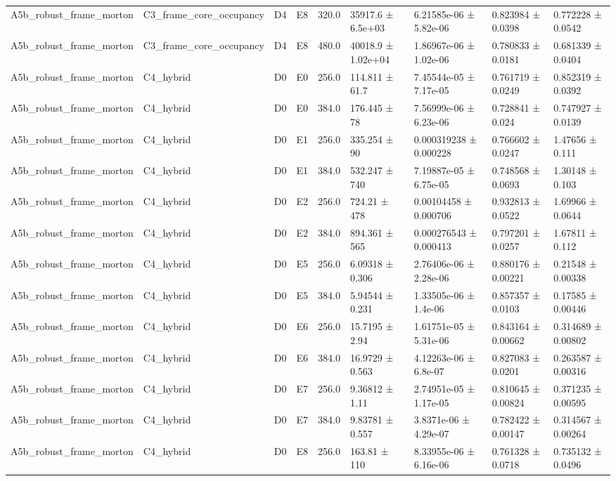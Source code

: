 \begin{table}
\begin{tabular}{lllllllll}
A5b\_robust\_frame\_morton & C3\_frame\_core\_occupancy & D4 & E8 & 320.0 & 35917.6 ± 6.5e+03 & 6.21585e-06 ± 5.82e-06 & 0.823984 ± 0.0398 & 0.772228 ± 0.0542 \\
A5b\_robust\_frame\_morton & C3\_frame\_core\_occupancy & D4 & E8 & 480.0 & 40018.9 ± 1.02e+04 & 1.86967e-06 ± 1.02e-06 & 0.780833 ± 0.0181 & 0.681339 ± 0.0404 \\
A5b\_robust\_frame\_morton & C4\_hybrid & D0 & E0 & 256.0 & 114.811 ± 61.7 & 7.45544e-05 ± 7.17e-05 & 0.761719 ± 0.0249 & 0.852319 ± 0.0392 \\
A5b\_robust\_frame\_morton & C4\_hybrid & D0 & E0 & 384.0 & 176.445 ± 78 & 7.56999e-06 ± 6.23e-06 & 0.728841 ± 0.024 & 0.747927 ± 0.0139 \\
A5b\_robust\_frame\_morton & C4\_hybrid & D0 & E1 & 256.0 & 335.254 ± 90 & 0.000319238 ± 0.000228 & 0.766602 ± 0.0247 & 1.47656 ± 0.111 \\
A5b\_robust\_frame\_morton & C4\_hybrid & D0 & E1 & 384.0 & 532.247 ± 740 & 7.19887e-05 ± 6.75e-05 & 0.748568 ± 0.0693 & 1.30148 ± 0.103 \\
A5b\_robust\_frame\_morton & C4\_hybrid & D0 & E2 & 256.0 & 724.21 ± 478 & 0.00104458 ± 0.000706 & 0.932813 ± 0.0522 & 1.69966 ± 0.0644 \\
A5b\_robust\_frame\_morton & C4\_hybrid & D0 & E2 & 384.0 & 894.361 ± 565 & 0.000276543 ± 0.000413 & 0.797201 ± 0.0257 & 1.67811 ± 0.112 \\
A5b\_robust\_frame\_morton & C4\_hybrid & D0 & E5 & 256.0 & 6.09318 ± 0.306 & 2.76406e-06 ± 2.28e-06 & 0.880176 ± 0.00221 & 0.21548 ± 0.00338 \\
A5b\_robust\_frame\_morton & C4\_hybrid & D0 & E5 & 384.0 & 5.94544 ± 0.231 & 1.33505e-06 ± 1.4e-06 & 0.857357 ± 0.0103 & 0.17585 ± 0.00446 \\
A5b\_robust\_frame\_morton & C4\_hybrid & D0 & E6 & 256.0 & 15.7195 ± 2.94 & 1.61751e-05 ± 5.31e-06 & 0.843164 ± 0.00662 & 0.314689 ± 0.00802 \\
A5b\_robust\_frame\_morton & C4\_hybrid & D0 & E6 & 384.0 & 16.9729 ± 0.563 & 4.12263e-06 ± 6.8e-07 & 0.827083 ± 0.0201 & 0.263587 ± 0.00316 \\
A5b\_robust\_frame\_morton & C4\_hybrid & D0 & E7 & 256.0 & 9.36812 ± 1.11 & 2.74951e-05 ± 1.17e-05 & 0.810645 ± 0.00824 & 0.371235 ± 0.00595 \\
A5b\_robust\_frame\_morton & C4\_hybrid & D0 & E7 & 384.0 & 9.83781 ± 0.557 & 3.8371e-06 ± 4.29e-07 & 0.782422 ± 0.00147 & 0.314567 ± 0.00264 \\
A5b\_robust\_frame\_morton & C4\_hybrid & D0 & E8 & 256.0 & 163.81 ± 110 & 8.33955e-06 ± 6.16e-06 & 0.761328 ± 0.0718 & 0.735132 ± 0.0496 \\

\end{tabular}
\end{table}
